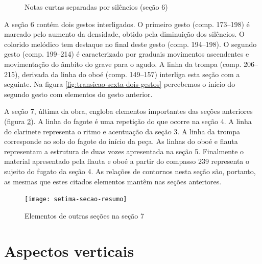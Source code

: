 \begin{figure}
  \centering


  \caption{Notas curtas separadas por silêncios (seção 6)}
  \label{fig:sexta-secao-notas-curtas}
\end{figure}

A seção 6 contém dois gestos interligados. O primeiro gesto
(comp. 173--198) é marcado pelo aumento da densidade, obtido pela
diminuição dos silêncios. O colorido melódico tem destaque no final
deste gesto (comp. 194--198). O segundo gesto (comp. 199--214) é
caracterizado por graduais movimentos ascendentes e movimentação do
âmbito do grave para o agudo. A linha da trompa (comp. 206--215),
derivada da linha do oboé (comp. 149--157) interliga esta seção com a
seguinte. Na figura \ref{fig:transicao-sexta-dois-gestos} percebemos o
início do segundo gesto com elementos do gesto anterior.

A seção 7, última da obra, engloba elementos importantes das seções
anteriores (figura \ref{fig:setima-secao-resumo}). A linha do fagote é
uma repetição do que ocorre na seção 4. A linha do clarinete
representa o ritmo e acentuação da seção 3. A linha da trompa
corresponde ao solo do fagote do início da peça. As linhas do oboé e
flauta representam a estrutura de duas vozes apresentada na seção
5. Finalmente o material apresentado pela flauta e oboé a partir do
compasso 239 representa o sujeito do fugato da seção 4. As relações de
contornos nesta seção são, portanto, as mesmas que estes citados
elementos mantêm nas seções anteriores.

\begin{figure}
  \centering
  \texttt{[image: setima-secao-resumo]}
  \caption{Elementos de outras seções na seção 7}
  \label{fig:setima-secao-resumo}
\end{figure}
\section{Aspectos verticais}
\label{sec:aspectos-verticais}


